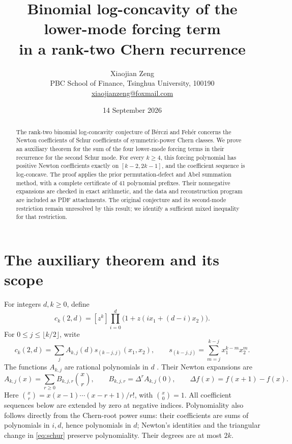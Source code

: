 \documentclass[11pt]{article}
\title{Binomial log-concavity of the lower-mode forcing term\\
in a rank-two Chern recurrence}
\author{Xiaojian Zeng\\[3pt]
\small PBC School of Finance, Tsinghua University, 100190\\
\small \href{mailto:xiaojianzeng@foxmail.com}{xiaojianzeng@foxmail.com}}
\date{14 September 2026}
\begin{document}
\maketitle
\begin{abstract}
The rank-two binomial log-concavity conjecture of B\'erczi and Feh\'er
concerns the Newton coefficients of Schur coefficients of symmetric-power
Chern classes. We prove an auxiliary theorem for the sum of the four
lower-mode forcing terms in their recurrence for the second Schur mode.
For every $k\geq4$, this forcing polynomial has positive Newton
coefficients exactly on $[k-2,2k-1]$, and the coefficient sequence is
log-concave. The proof applies the prior permutation-defect and Abel
summation method, with a complete certificate of 41 polynomial prefixes.
Their nonnegative expansions are checked in exact arithmetic, and the
data and reconstruction program are included as PDF attachments.
The original conjecture and its second-mode restriction remain unresolved
by this result; we identify a sufficient mixed inequality for that restriction.
\end{abstract}

\section{The auxiliary theorem and its scope}

For integers $d,k\geq0$, define
\begin{equation}\label{eq:chern}
c_k(2,d)=[z^k]\prod_{i=0}^{d}\bigl(1+z(ix_1+(d-i)x_2)\bigr).
\end{equation}
For $0\leq j\leq\lfloor k/2\rfloor$, write
\begin{equation}\label{eq:schur}
c_k(2,d)=\sum_j A_{k,j}(d)s_{(k-j,j)}(x_1,x_2),\qquad
s_{(k-j,j)}=\sum_{m=j}^{k-j}x_1^{k-m}x_2^m.
\end{equation}
The functions $A_{k,j}$ are rational polynomials in $d$
\cite[Theorem 2.4 and Section 3]{BercziFeher2026}. Their Newton expansions are
\begin{equation}\label{eq:newton}
A_{k,j}(x)=\sum_{r\geq0} B_{k,j,r}\binom{x}{r},\qquad
B_{k,j,r}=\Delta^r A_{k,j}(0),\qquad
\Delta f(x)=f(x+1)-f(x).
\end{equation}
Here $\binom{x}{r}=x(x-1)\cdots(x-r+1)/r!$, with $\binom{x}{0}=1$.
All coefficient sequences below are extended by zero at negative indices.
Polynomiality also follows directly from the Chern-root power sums:
their coefficients are sums of polynomials in $i,d$, hence polynomials
in $d$; Newton's identities and the triangular change in
\eqref{eq:schur} preserve polynomiality. Their degrees are at most $2k$.
\end{document}
